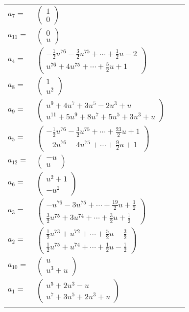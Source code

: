 \documentclass[1p]{elsarticle_modified}
\theoremstyle{definition}
\begin{document}
\begin{tabular}{m{7pt} m{180pt} m{7pt} m{180pt} }
\flushright $a_{7}=$&$\begin{pmatrix}1\\0\end{pmatrix}$ \\
\flushright $a_{11}=$&$\begin{pmatrix}0\\u\end{pmatrix}$ \\
\flushright $a_{4}=$&$\begin{pmatrix}-\frac{1}{2} u^{76}-\frac{3}{2} u^{75}+\cdots+\frac{1}{2} u-2\\u^{76}+4 u^{75}+\cdots+\frac{5}{2} u+1\end{pmatrix}$ \\
\flushright $a_{8}=$&$\begin{pmatrix}1\\u^2\end{pmatrix}$ \\
\flushright $a_{9}=$&$\begin{pmatrix}u^9+4 u^7+3 u^5-2 u^3+u\\u^{11}+5 u^9+8 u^7+5 u^5+3 u^3+u\end{pmatrix}$ \\
\flushright $a_{5}=$&$\begin{pmatrix}-\frac{1}{2} u^{76}-\frac{3}{2} u^{75}+\cdots+\frac{23}{2} u+1\\-2 u^{76}-4 u^{75}+\cdots+\frac{9}{2} u+1\end{pmatrix}$ \\
\flushright $a_{12}=$&$\begin{pmatrix}- u\\u\end{pmatrix}$ \\
\flushright $a_{6}=$&$\begin{pmatrix}u^2+1\\- u^2\end{pmatrix}$ \\
\flushright $a_{3}=$&$\begin{pmatrix}- u^{76}-3 u^{75}+\cdots+\frac{19}{2} u+\frac{1}{2}\\\frac{3}{2} u^{75}+3 u^{74}+\cdots+\frac{3}{2} u+\frac{1}{2}\end{pmatrix}$ \\
\flushright $a_{2}=$&$\begin{pmatrix}\frac{1}{2} u^{73}+u^{72}+\cdots+\frac{5}{2} u-\frac{3}{2}\\\frac{1}{2} u^{75}+u^{74}+\cdots+\frac{1}{2} u-\frac{1}{2}\end{pmatrix}$ \\
\flushright $a_{10}=$&$\begin{pmatrix}u\\u^3+u\end{pmatrix}$ \\
\flushright $a_{1}=$&$\begin{pmatrix}u^5+2 u^3- u\\u^7+3 u^5+2 u^3+u\end{pmatrix}$\\&\end{tabular}
\end{document}
